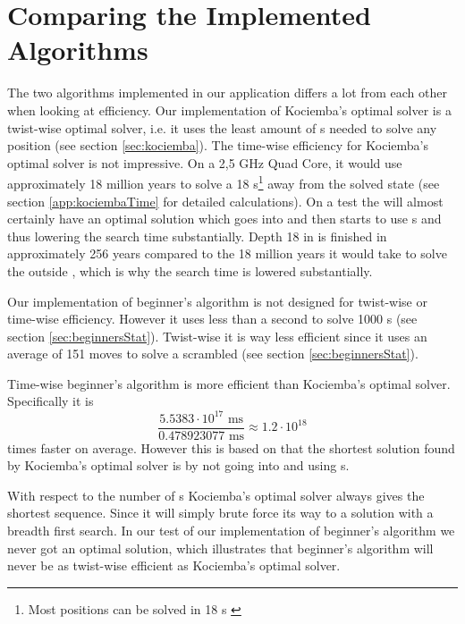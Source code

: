 \section{Comparing the Implemented Algorithms}
The two algorithms implemented in our application differs a lot from each other when looking at efficiency. 
Our implementation of Kociemba's optimal solver is a twist-wise optimal solver, i.e. it uses the least amount of \twist{}s needed to solve any position (see section \ref{sec:kociemba}).
The time-wise efficiency for Kociemba's optimal solver is not impressive.
On a 2,5 GHz Quad Core, it would use approximately 18 million years to solve a \cube{} 18 \twist{}s\footnote{Most positions can be solved in 18 \twist{}s \cite{kociemba09}} away from the solved state (see section \ref{app:kociembaTime} for detailed calculations).   
On a test the \rubik{} will almost certainly have an optimal solution which goes into  and then starts to use  \twist{}s and thus lowering the search time substantially.
Depth 18 in  is finished in approximately 256 years compared to the 18 million years it would take to solve the \cube{} outside , which is why the search time is lowered substantially.



Our implementation of beginner's algorithm is not designed for twist-wise or time-wise efficiency. However it uses less than a second to solve 1000 \cube{}s (see section \ref{sec:beginnersStat}). 
Twist-wise it is way less efficient since it uses an average of 151 moves to solve a scrambled \cube{} (see section \ref{sec:beginnersStat}).

Time-wise beginner's algorithm is more efficient than Kociemba's optimal solver.
Specifically it is 
\begin{equation*}
\frac{5.5383 \cdot 10^{17} \text{ ms}}{0.478923077 \text{ ms}} \approx 1.2 \cdot 10^{18}
\end{equation*}
times faster on average.
However this is based on that the shortest solution found by Kociemba's optimal solver is by not going into  and using  \twist{}s.

With respect to the number of \twist{}s Kociemba's optimal solver always gives the shortest \twist{} sequence.
Since it will simply brute force its way to a solution with a breadth first search.
In our test of our implementation of beginner's algorithm we never got an optimal solution, which illustrates that beginner's algorithm will never be as twist-wise efficient as Kociemba's optimal solver.

